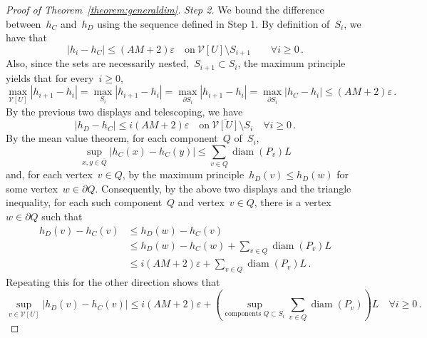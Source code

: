 \documentclass[12pt]{amsart}
\numberwithin{equation}{section}
\DeclareMathOperator{\diam}{{\mathop{diam}}}
\newcommand{\V}{\mathcal{V}}
\newcommand{\eps}{\varepsilon}
\begin{document}
\begin{proof}[Proof of Theorem~\ref{theorem:generaldim}]
	
	\emph{Step 2.} We bound the difference between~$h_C$ and~$h_D$ using the sequence defined in Step 1.
	By definition of~$S_{i}$, we have that 
	\[
	|h_i - h_C| \leq (A M+2) \eps \quad \mbox{on} \ \V[U] \setminus S_{i+1}  \qquad \forall i \geq 0 \, . 
	\]
	Also, since the sets are necessarily nested,~$S_{i+1} \subset S_i$, the maximum principle yields that for every~$i \geq 0$,
\[
	\max_{\V[U]} |h_{i+1} - h_{i} | = \max_{S_{i}} |h_{i+1} - h_{i} | = 
	 \max_{\partial S_{i}} |h_{i+1} - h_{i} | = \max_{\partial S_{i} } |h_C - h_i| \leq 
	 (A M+2) \eps \, . 
\]
By the previous two displays and telescoping, we have 
	\begin{equation}
		\label{eq:telescoping-bound}
		|h_D - h_C|  \leq  {i (A M+2) \eps} 
		 \quad  \mbox{on}   \ \overline{\V[U]} \setminus S_i  \quad \forall i \geq 0 \, . 
	\end{equation}
	 By the mean value theorem, 
	 for each component~$Q$ of~$S_i$, 
	\[
	\sup_{x, y \in \overline{Q}} |h_C(x) - h_C(y)| \leq {\sum_{v \in Q} \diam(P_v)  L}
	\]
	and, for each vertex~$v \in Q$, by the maximum principle~$h_D(v) \leq h_D(w)$ for some vertex~$w \in \partial Q$. Consequently, by the above two displays and the triangle inequality, for each such component~$Q$ and vertex~$v \in Q$, there is a vertex~$w \in \partial Q$ such that
	\begin{align*}
		h_D(v) - h_C(v) &\leq h_D(w) - h_C(v)   \\
		&\leq h_D(w) - h_C(w) +  {\sum_{v \in Q} \diam(P_v)  L} \\
		&\leq i (A M+2) \eps  +  {\sum_{v \in Q} \diam(P_v)  L} \, . 
	\end{align*}
	Repeating this for the other direction shows that
	\begin{equation}
		\label{eq:bound-which-includes-diameter}
		\sup_{v \in \V[U]}|h_D(v) - h_C(v)|  \leq  {i (A M+2) \eps}  + \left( \sup_{\mbox{components $Q \subset S_i$}} {\sum_{v \in Q} \diam(P_v)}  \right) L  \quad \forall i \geq 0 \, . 
	\end{equation}

	\smallskip 
	

\end{proof}
\end{document}
